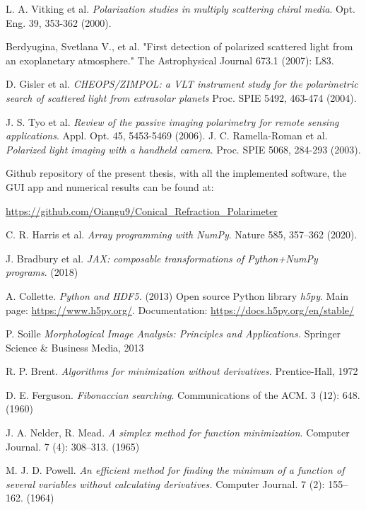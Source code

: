 \documentclass[11pt, a4paper, twoside]{article} %
\begin{document}
\begin{thebibliography}{1}
{
L. A. Vitking et al. {\em Polarization studies in multiply scattering chiral media}. Opt. Eng. 39, 353-362 (2000).

Berdyugina, Svetlana V., et al. "First detection of polarized scattered light from an exoplanetary atmosphere." The Astrophysical Journal 673.1 (2007): L83.

D. Gisler et al. {\em CHEOPS/ZIMPOL: a VLT instrument study for the polarimetric search of scattered light from extrasolar planets} Proc. SPIE 5492, 463-474 (2004).

J. S. Tyo et al. {\em  Review of the passive imaging polarimetry for remote sensing applications}. Appl. Opt. 45, 5453-5469 (2006).
J. C. Ramella-Roman et al. {\em Polarized light imaging with a handheld camera}. Proc. SPIE 5068, 284-293 (2003).

Github repository of the present thesis, with all the implemented software, the GUI app and numerical results can be found at:

\href{https://github.com/Oiangu9/Conical_Refraction_Polarimeter}{https://github.com/Oiangu9/Conical\_Refraction\_Polarimeter}

C. R. Harris et al. {\em Array programming with NumPy}. Nature 585, 357–362 (2020).


J. Bradbury et al. {\em {JAX}: composable transformations of {P}ython+{N}um{P}y programs}. (2018)

A. Collette. {\em Python and HDF5.} (2013) Open source Python library {\em h5py}. Main page: \href{https://www.h5py.org/}{https://www.h5py.org/}. Documentation: \href{https://docs.h5py.org/en/stable/}{https://docs.h5py.org/en/stable/}

P. Soille {\em Morphological Image Analysis: Principles and Applications.} Springer Science \& Business Media, 2013

R. P. Brent. {\em Algorithms for minimization without derivatives.} Prentice-Hall, 1972

D. E. Ferguson. {\em Fibonaccian searching}. Communications of the ACM. 3 (12): 648. (1960)

J. A. Nelder, R. Mead. {\em A simplex method for function minimization}. Computer Journal. 7 (4): 308–313. (1965)

M. J. D.  Powell. {\em An efficient method for finding the minimum of a function of several variables without calculating derivatives.} Computer Journal. 7 (2): 155–162. (1964)

}
\end{thebibliography}
\end{document}
